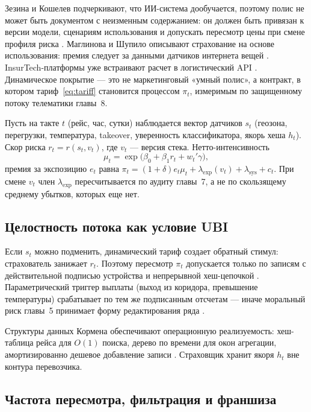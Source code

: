 \documentclass[a4paper,14pt]{extarticle}
\begin{document}
Зезина и Кошелев подчеркивают, что ИИ-система дообучается, поэтому полис не может быть документом с неизменным содержанием: он должен быть привязан к версии модели, сценариям использования и допускать пересмотр цены при смене профиля риска \cite{zezina}. Маглинова и Шупило описывают страхование на основе использования: премия следует за данными датчиков интернета вещей \cite{maglinova}. InsurTech-платформы уже встраивают расчет в логистический API \cite{insurtech}. Динамическое покрытие --- это не маркетинговый «умный полис», а контракт, в котором тариф~\eqref{eq:tariff} становится процессом $\pi_t$, измеримым по защищенному потоку телематики главы~8.

Пусть на такте $t$ (рейс, час, сутки) наблюдается вектор датчиков $s_t$ (геозона, перегрузки, температура, takeover, уверенность классификатора, якорь хеша $h_t$). Скор риска $r_t=r(s_t,v_t)$, где $v_t$ --- версия стека. Нетто-интенсивность
\begin{equation}
\mu_t=\exp\bigl(\beta_0+\beta_1 r_t+w_t'\gamma\bigr),
\label{eq:dynmu}
\end{equation}
премия за экспозицию $e_t$ равна $\pi_t=(1+\delta)e_t\mu_t+\lambda_{\mathrm{exp}}(v_t)+\lambda_{\mathrm{sys}}+c_t$. При смене $v_t$ член $\lambda_{\mathrm{exp}}$ пересчитывается по аудиту главы~7, а не по скользящему среднему убытков, которых еще нет.

\subsection{Целостность потока как условие UBI}

Если $s_t$ можно подменить, динамический тариф создает обратный стимул: страхователь занижает $r_t$. Поэтому пересмотр $\pi_t$ допускается только по записям с действительной подписью устройства и непрерывной хеш-цепочкой \cite{borevich, cormen, cbr}. Параметрический триггер выплаты (выход из коридора, превышение температуры) срабатывает по тем же подписанным отсчетам --- иначе моральный риск главы~5 принимает форму редактирования ряда \cite{pindyck}.

Структуры данных Кормена обеспечивают операционную реализуемость: хеш-таблица рейса для $O(1)$ поиска, дерево по времени для окон агрегации, амортизированно дешевое добавление записи \cite{cormen}. Страховщик хранит якоря $h_t$ вне контура перевозчика.

\subsection{Частота пересмотра, фильтрация и франшиза}
\end{document}
